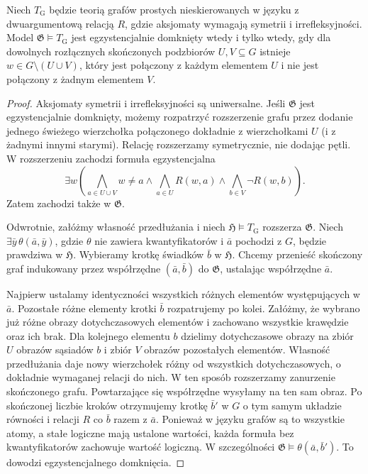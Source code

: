 \begin{przyklad}
\label{ex:mod-mc-ec-graphs}
Niech $T_{\mathrm G}$ będzie teorią grafów prostych
nieskierowanych w języku z dwuargumentową relacją $R$,
gdzie aksjomaty wymagają symetrii i irrefleksyjności.
Model $\mathfrak G\models T_{\mathrm G}$ jest
egzystencjalnie domknięty wtedy i tylko wtedy,
gdy dla dowolnych rozłącznych skończonych podzbiorów
$U,V\subseteq G$ istnieje $w\in G\setminus(U\cup V)$,
który jest połączony z każdym elementem $U$
i nie jest połączony z żadnym elementem $V$.
\begin{proof}
Aksjomaty symetrii i irrefleksyjności są uniwersalne.
Jeśli $\mathfrak G$ jest egzystencjalnie domknięty,
możemy rozpatrzyć rozszerzenie grafu przez dodanie
jednego świeżego wierzchołka połączonego dokładnie
z wierzchołkami $U$ (i z żadnymi innymi starymi).
Relację rozszerzamy symetrycznie, nie dodając pętli.
W rozszerzeniu zachodzi formuła egzystencjalna
\[
\exists w\left(
\bigwedge_{a\in U\cup V}w\ne a
\land\bigwedge_{a\in U}R(w,a)
\land\bigwedge_{b\in V}\neg R(w,b)
\right).
\]
Zatem zachodzi także w $\mathfrak G$.

Odwrotnie, załóżmy własność przedłużania i niech
$\mathfrak H\models T_{\mathrm G}$ rozszerza $\mathfrak G$.
Niech $\exists\bar y\,\theta(\bar a,\bar y)$,
gdzie $\theta$ nie zawiera kwantyfikatorów i
$\bar a$ pochodzi z $G$, będzie prawdziwa w $\mathfrak H$.
Wybieramy krotkę świadków $\bar b$ w $\mathfrak H$.
Chcemy przenieść skończony graf indukowany przez
współrzędne $(\bar a,\bar b)$ do $\mathfrak G$,
ustalając współrzędne $\bar a$.

Najpierw ustalamy identyczności wszystkich różnych
elementów występujących w $\bar a$.
Pozostałe różne elementy krotki $\bar b$ rozpatrujemy
po kolei. Załóżmy, że wybrano już różne obrazy
dotychczasowych elementów i zachowano wszystkie
krawędzie oraz ich brak. Dla kolejnego elementu $b$
dzielimy dotychczasowe obrazy na zbiór $U$ obrazów
sąsiadów $b$ i zbiór $V$ obrazów pozostałych elementów.
Własność przedłużania daje nowy wierzchołek różny
od wszystkich dotychczasowych, o dokładnie wymaganej
relacji do nich. W ten sposób rozszerzamy zanurzenie
skończonego grafu. Powtarzające się współrzędne
wysyłamy na ten sam obraz.
Po skończonej liczbie kroków otrzymujemy krotkę
$\bar b'$ w $G$ o tym samym układzie równości
i relacji $R$ co $\bar b$ razem z $\bar a$.
Ponieważ w języku grafów są to wszystkie atomy,
a stałe logiczne mają ustalone wartości, każda formuła bez
kwantyfikatorów zachowuje wartość logiczną.
W szczególności $\mathfrak G\models\theta(\bar a,\bar b')$.
To dowodzi egzystencjalnego domknięcia.
\end{proof}
\end{przyklad}

